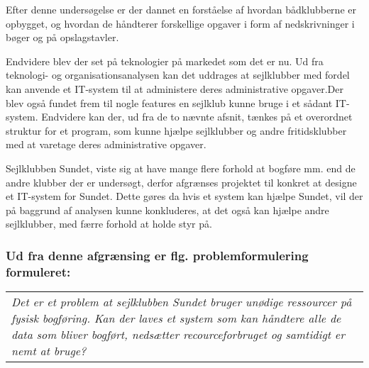 Efter denne undersøgelse er der dannet en forståelse af hvordan bådklubberne er opbygget, og hvordan de håndterer
forskellige opgaver i form af nedskrivninger i bøger og på opslagstavler.

Endvidere blev der set på teknologier på markedet som det er nu. Ud fra teknologi- og organisationsanalysen kan det
uddrages at sejlklubber med fordel kan anvende et IT-system til at administere deres administrative opgaver.Der blev
også fundet frem til nogle features en sejlklub kunne bruge i et sådant IT-system. Endvidere kan der, ud fra de to
nævnte afsnit, tænkes på et overordnet struktur for et program, som kunne hjælpe sejlklubber og andre fritidsklubber med
at varetage deres administrative opgaver.

Sejlklubben Sundet, viste sig at have mange flere forhold at bogføre mm. end de andre klubber der er undersøgt, derfor afgrænses projektet til konkret at designe et IT-system for Sundet. Dette gøres da hvis et system kan hjælpe Sundet, vil der på baggrund af analysen kunne konkluderes, at det også kan hjælpe andre sejlklubber, med færre forhold at holde styr på. 

\subsubsection*{Ud fra denne afgrænsing er flg. problemformulering formuleret:}
\begin{center}
\begin{tabular}{|p{14cm}|}
\textit{Det er et problem at sejlklubben Sundet bruger unødige ressourcer på fysisk bogføring. Kan der laves et system som kan håndtere alle de data som bliver bogført, nedsætter recourceforbruget og samtidigt er nemt at bruge? }
\end{tabular}
\end{center}


